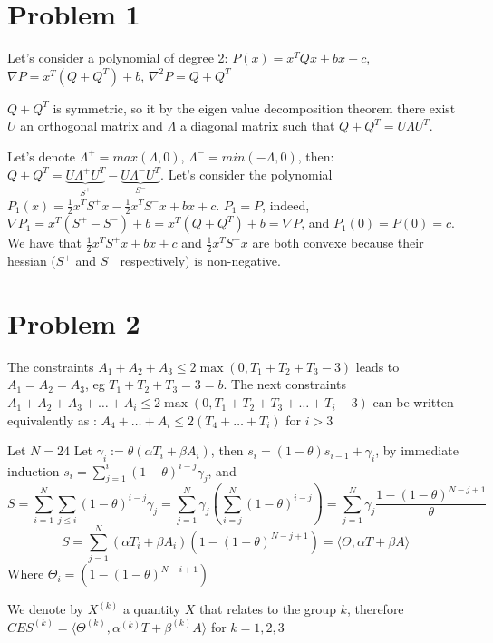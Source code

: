 \documentclass[11pt]{article}
\author{bachir el khadir}
\date{\today}
\title{}
\begin{document}
\tableofcontents



\section{Problem 1}
\label{sec:orgheadline1}
Let's consider a polynomial of degree 2: \(P(x) = x^TQx + bx + c\), \(\nabla P = x^T(Q + Q^T) + b\), \(\nabla^2 P = Q + Q^T\)

\(Q + Q^T\) is symmetric, so it by the eigen value decomposition theorem there exist \(U\) an orthogonal matrix and \(\Lambda\) a diagonal matrix such that \(Q+Q^T = U\Lambda U^T\).

Let's denote \(\Lambda^+ = max(\Lambda, 0)\), \(\Lambda^- = min(-\Lambda, 0)\), then: \(Q+Q^T = \underbrace{U\Lambda^+ U^T}_{S^+} -  \underbrace{U\Lambda^- U^T}_{S^-}\).
Let's consider the polynomial \(P_1(x) = \frac12 x^TS^+x - \frac12 x^TS^-x + bx + c\). \(P_1 = P\), indeed, \(\nabla P_1 = x^T(S^+ - S^-) + b = x^T(Q+Q^T) + b= \nabla P\), and \(P_1(0) = P(0) = c\).
We have that \(\frac12 x^TS^+x + bx + c\) and \(\frac12 x^TS^-x\) are both convexe because their hessian (\(S^+\) and \(S^-\) respectively) is non-negative.

\section{Problem 2}
\label{sec:orgheadline2}


The constraints \(A_1+A_2+A_3 \le 2 \max(0, T_1+T_2+T_3 - 3)\) leads to \(A_1 = A_2 = A_3\), eg \(T_1 + T_2 + T_3 = 3 = b\).
The next constraints \(A_1 + A_2 + A_3 + \ldots  + A_i \le 2\max(0, T_1 + T_2 + T_3 + \ldots + T_i- 3)\) can be written equivalently as : \(A_4 + \ldots + A_i \le 2(T_4 + \ldots + T_i)\) for \(i > 3\)


Let \(N = 24\)
Let \(\gamma_i := \theta(\alpha T_i + \beta A_i)\), then \(s_i = (1-\theta)s_{i-1} + \gamma_i\), by immediate induction \(s_i = \sum_{j=1}^i (1-\theta)^{i-j} \gamma_j\),
and $$S = \sum_{i=1}^{N} \sum_{j \le i} (1-\theta)^{i-j} \gamma_j = \sum_{j=1}^N \gamma_j (\sum_{i=j}^N(1-\theta)^{i-j}) = \sum_{j=1}^N \gamma_j \frac{1 - (1-\theta)^{N-j+1}}{\theta}  $$
$$S = \sum_{j=1}^N (\alpha T_i + \beta A_i) (1 - (1-\theta)^{N-j+1}) = \langle \Theta, \alpha T + \beta A \rangle  $$
Where \(\Theta_i = (1 - (1-\theta)^{N-i+1})\)

We denote by \(X^{(k)}\) a quantity \(X\) that relates to the group \(k\), therefore \(CES^{(k)} = \langle \Theta^{(k)}, \alpha^{(k)} T + \beta^{(k)} A \rangle\) for \(k = 1, 2, 3\)
\end{document}

